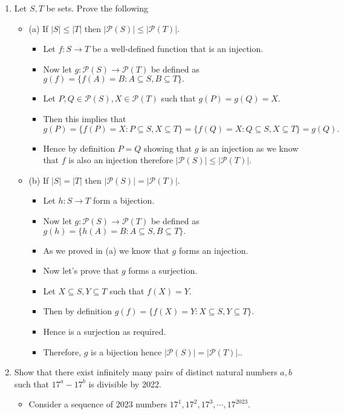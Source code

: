 \documentclass[letterpaper,12pt]{article}
\begin{document}
\begin{enumerate}
\item Let $S,T$ be sets. Prove the following
\begin{itemize}
	\item (a) If $|S| \leq |T|$ then $|\mathcal{P}(S)| \leq |\mathcal{P}(T)|.$
	\begin{itemize}
	\item Let $f : S \rightarrow T$ be a well-defined function  that is an injection.
	\item Now let $g:\mathcal{P}(S) \rightarrow \mathcal{P}(T)$ be defined as $g(f)=\{f(A) =B : A \subseteq S, B \subseteq T\}.$
	\item Let $P,Q \in \mathcal{P}(S), X \in \mathcal{P}(T)$ such that $g(P) = g(Q) = X.$
	\item Then this implies that $g(P) = \{f(P)= X:P \subseteq S, X \subseteq T\} = \{f(Q) = X:Q\subseteq S, X \subseteq T\}=g(Q).$
	\item Hence by definition $P=Q$ showing that $g$ is an injection as we know that $f$ is also an injection therefore $|\mathcal{P}(S)| \leq |\mathcal{P}(T)|.$
	\end{itemize}
	\item (b) If $|S| = |T|$ then $|\mathcal{P}(S)| = |\mathcal{P}(T)|.$
	\begin{itemize}
	\item Let $h:S \rightarrow T$ form a bijection.
	\item Now let $g:\mathcal{P}(S) \rightarrow \mathcal{P}(T)$ be defined as $g(h)=\{h(A) =B : A \subseteq S, B \subseteq T\}.$
	\item As we proved in (a) we know that $g$ forms an injection.
	\item Now let's prove that $g$ forms a surjection.
	\item Let $X \subseteq S, Y\subseteq T$ such that $f(X) =Y$.
	\item Then by definition $g(f) = \{f(X) = Y: X \subseteq S, Y \subseteq T\}$.
	\item Hence is a surjection as required.
	\item Therefore, $g$ is a bijection hence $|\mathcal{P}(S)| = |\mathcal{P}(T)|.$.
	\end{itemize}
\end{itemize}
\item Show that there exist infinitely many pairs of distinct natural numbers $a,b$ such that $17^a-17^b$ is divisible by 2022.
\begin{itemize}
	\item Consider a sequence of 2023 numbers $17^1,17^2,17^3,\cdots,17^{2023}$.

\end{itemize}
\end{enumerate}
\end{document}
